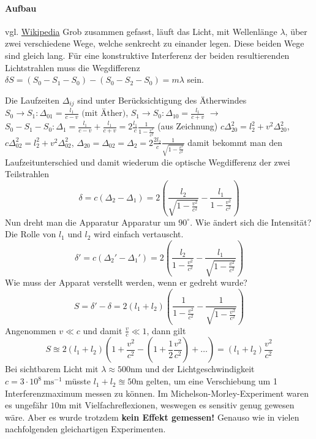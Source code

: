 \documentclass[oneside]{book}
\theoremstyle{definition}
\newcommand{\conseq}{$\rightarrow$~}
\begin{document}
\paragraph{Aufbau} vgl. \href{https://de.wikipedia.org/wiki/Michelson-Morley-Experiment}{Wikipedia}
Grob zusammen gefasst, läuft das Licht, mit Wellenlänge $\lambda$, über zwei verschiedene Wege, welche senkrecht zu einander legen. Diese beiden Wege sind gleich lang. Für eine konstruktive Interferenz der beiden resultierenden Lichtstrahlen muss die Wegdifferenz $\delta S = (S_0 - S_1 - S_0) - (S_0 - S_2 - S_0) = m \lambda$ sein.

Die Laufzeiten $\Delta_{ij}$ sind unter Berücksichtigung des Ätherwindes $S_0 \to S_1: \Delta_{01} = \frac{l_1}{c - v} \text{~(mit Äther)}$, $S_1 \to S_0: \Delta_{10} = \frac{l_1}{c + v}$ \conseq $S_0 - S_1 - S_0: \Delta_1 = \frac{l_1}{c-v} + \frac{l_1}{c+v} = 2 \frac{l_1}{c} \frac{1}{1 - \frac{v^2}{c^2}}$ (aus Zeichnung) $c\Delta_{20}^2 = l_2^2 + v^2 \Delta_{20}^2$, $c\Delta_{02}^2 = l_2^2 + v^2 \Delta_{02}^2$, $\Delta_{20} = \Delta_{02} = \Delta_{2} = 2 \frac{2l_2}{c} \frac{1}{\sqrt{1 - \frac{v^2}{c^2}}}$ damit bekommt man den Laufzeitunterschied und damit wiederum die optische Wegdifferenz der zwei Teilstrahlen
$$\delta = c (\Delta_2 - \Delta_1) = 2 \left(\frac{l_2}{\sqrt{1 - \frac{v^2}{c^2}}} - \frac{l_1}{1 - \frac{v^2}{c^2}}\right)$$ 
Nun dreht man die Apparatur Apparatur um $90^\circ$. Wie ändert sich die Intensität? Die Rolle von $l_1$ und $l_2$ wird einfach vertauscht.
$$\delta' = c (\Delta_2' - \Delta_1') = 2 \left(\frac{l_2}{1 - \frac{v^2}{c^2}} - \frac{l_1}{\sqrt{1 - \frac{v^2}{c^2}}}\right)$$
Wie muss der Apparat verstellt werden, wenn er gedreht wurde?
$$S = \delta' - \delta = 2(l_1 + l_2) \left(\frac{1}{1-\frac{v^2}{c^2}} - \frac{1}{\sqrt{1 - \frac{v^2}{c^2}}}\right)$$
Angenommen  $v \ll c$ und damit $\frac{v}{c} \ll 1$, dann gilt
$$S \approxeq 2 (l_1 + l_2) \left(1 + \frac{v^2}{c^2} - (1 + \frac{1}{2} \frac{v^2}{c^2}) + \dots\right) = (l_1 + l_2) \frac{v^2}{c^2}$$
Bei sichtbarem Licht mit $\lambda \approx 500 \mathrm{nm}$ und der Lichtgeschwindigkeit $c = 3 \cdot 10^8 ~\mathrm{m} \mathrm{s}^{-1}$ müsste $l_1 + l_2 \approxeq 50 \mathrm{m}$ gelten, um eine Verschiebung um 1 Interferenzmaximum messen zu können.
Im Michelson-Morley-Experiment waren es ungefähr $10 \mathrm{m}$ mit Vielfachreflexionen, weswegen es sensitiv genug gewesen wäre. Aber es wurde trotzdem \textbf{kein Effekt gemessen!} Genauso wie in vielen nachfolgenden gleichartigen Experimenten.
\end{document}
